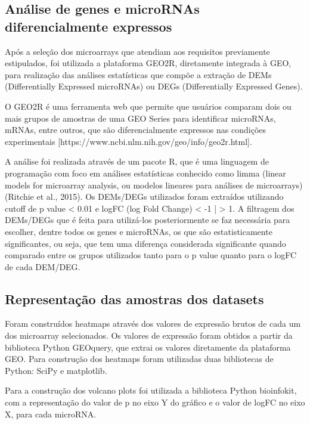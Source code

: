 \documentclass[12pt, a4paper]{article}
\begin{document}
    \subsection{Análise de genes e microRNAs diferencialmente expressos}
    \par Após a seleção dos microarrays que atendiam aos requisitos previamente estipulados, foi utilizada a plataforma GEO2R, diretamente integrada à GEO, para realização das análises estatísticas que compõe a extração de DEMs (Differentially Expressed microRNAs) ou DEGs (Differentially Expressed Genes).
    \par O GEO2R é uma ferramenta web que permite que usuários comparam dois ou mais grupos de amostras de uma GEO Series para identificar microRNAs, mRNAs, entre outros, que são diferencialmente expressos nas condições experimentais [https://www.ncbi.nlm.nih.gov/geo/info/geo2r.html].
    \par A análise foi realizada através de um pacote R, que é uma linguagem de programação com foco em análises estatísticas conhecido como limma (linear models for microarray analysis, ou modelos lineares para análises de microarrays) (Ritchie et al., 2015). Os DEMs/DEGs utilizados foram extraídos utilizando cutoff de p value < 0.01 e logFC (log Fold Change) < -1 | > 1. A filtragem dos DEMs/DEGs que é feita para utilizá-los posteriormente se faz necessária para escolher, dentre todos os genes e microRNAs, os que são estatisticamente significantes, ou seja, que tem uma diferença considerada significante quando comparado entre os grupos utilizados tanto para o p value quanto para o logFC de cada DEM/DEG.

    \subsection{Representação das amostras dos datasets}
    \par Foram construídos heatmaps através dos valores de expressão brutos de cada um dos microarray selecionados. Os valores de expressão foram obtidos a partir da biblioteca Python GEOquery, que extrai os valores diretamente da plataforma GEO. Para construção dos heatmaps foram utilizadas duas bibliotecas de Python: SciPy e matplotlib.
    \par Para a construção dos volcano plots foi utilizada a biblioteca Python bioinfokit, com a representação do valor de p no eixo Y do gráfico e o valor de logFC no eixo X, para cada microRNA.
\end{document}
